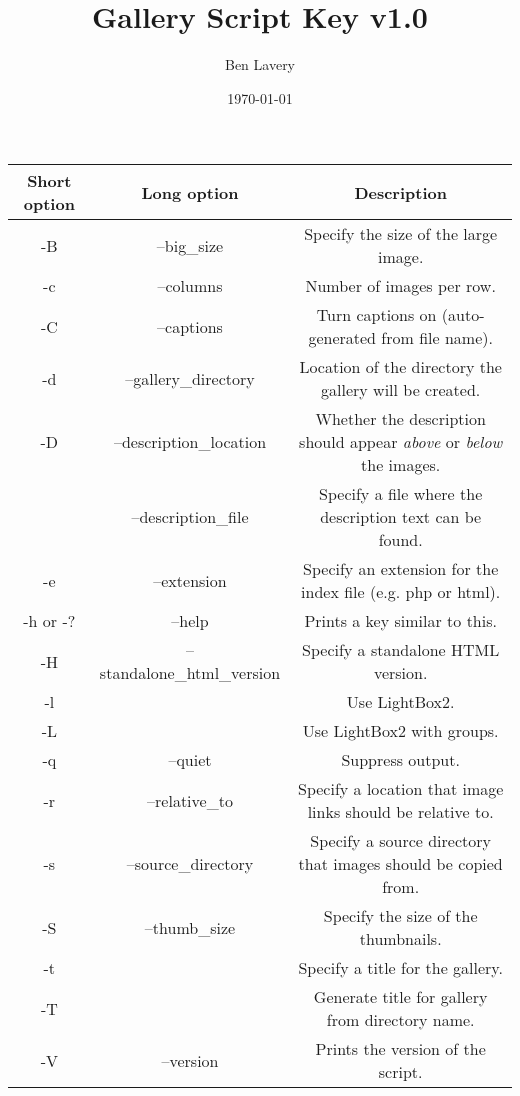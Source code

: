 \documentclass[12pt]{amsart}
\title{Gallery Script Key v1.0}
\author{Ben Lavery}
\date{\today} %
\begin{document}
\maketitle

\begin{tabular}{|c|c|c|}
\hline
Short option	&	Long option				&	Description  \\ \hline \hline
										
-B			&	--big\_size					&	Specify the size of the large image. \\ \hline
-c			&	--columns					&	Number of images per row. \\ \hline
-C			&	--captions					&	Turn captions on (auto-generated from file name). \\ \hline
-d			&	--gallery\_directory			&	Location of the directory the gallery will be created. \\ \hline
-D			&	--description\_location		&	Whether the description should appear {\textit{above}} or {\textit{below}} the images. \\ \hline
			&	--description\_file			&	Specify a file where the description text can be found. \\ \hline
-e			&	--extension				&	Specify an extension for the index file (e.g. php or html). \\ \hline
-h or -?		&	--help					&	Prints a key similar to this. \\ \hline
-H			&	--standalone\_html\_version	&	Specify a standalone HTML version. \\ \hline
-l			&							&	Use LightBox2. \\ \hline
-L			&							&	Use LightBox2 with groups. \\ \hline
-q			&	--quiet					&	Suppress output. \\ \hline
-r			&	--relative\_to				&	Specify a location that image links should be relative to. \\ \hline
-s			&	--source\_directory			&	Specify a source directory that images should be copied from. \\ \hline
-S			&	--thumb\_size				&	Specify the size of the thumbnails. \\ \hline
-t			&							&	Specify a title for the gallery. \\ \hline
-T			&							&	Generate title for gallery from directory name. \\ \hline
-V			&	--version					&	Prints the version of the script.\\ \hline


\end{tabular}
\end{document}
